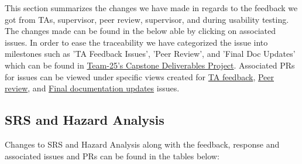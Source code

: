 \documentclass{article}
\begin{document}

This section summarizes the changes we have made in regards to the feedback we got from TAs, supervisor, peer review, supervisor, and during usability testing. 
The changes made can be found in the below able by clicking on associated issues. 
In order to ease the traceability we have categorized the issue into milestones such as 'TA Feedback Issues', 'Peer Review', and 'Final Doc Updates' which can be found in \href{https://github.com/users/Inreet-Kaur/projects/2/views/1}{Team-25's Capstone Deliverables Project}. Associated PRs for issues can be viewed under specific views created for \href{https://github.com/users/Inreet-Kaur/projects/2/views/8?sliceBy%5Bvalue%5D=TA+Feedback+Issues}{TA feedback},  \href{https://github.com/users/Inreet-Kaur/projects/2/views/10?sliceBy%5Bvalue%5D=Peer+Review}{Peer review}, and \href{https://github.com/users/Inreet-Kaur/projects/2/views/9?sliceBy%5Bvalue%5D=Milestone+8+-+Final+Doc+Updates}{Final documentation updates} issues.

\subsection{SRS and Hazard Analysis}

Changes to SRS and Hazard Analysis along with the feedback, response and associated issues and PRs can be found in the tables below: 
\end{document}
